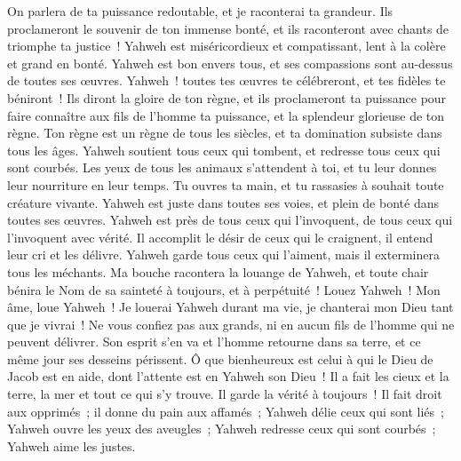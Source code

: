 \begin{multicols}{2}
 On parlera de ta puissance redoutable, et je raconterai ta grandeur.
 Ils proclameront le souvenir de ton immense bonté, et ils raconteront avec chants de triomphe ta justice~!
 Yahweh est miséricordieux et compatissant, lent à la colère et grand en bonté.
 Yahweh est bon envers tous, et ses compassions sont au-dessus de toutes ses œuvres.
 Yahweh~! toutes tes œuvres te célébreront, et tes fidèles te béniront~!
 Ils diront la gloire de ton règne, et ils proclameront ta puissance
 pour faire connaître aux fils de l'homme ta puissance, et la splendeur glorieuse de ton règne.
 Ton règne est un règne de tous les siècles, et ta domination subsiste dans tous les âges.
 Yahweh soutient tous ceux qui tombent, et redresse tous ceux qui sont courbés.
 Les yeux de tous les animaux s'attendent à toi, et tu leur donnes leur nourriture en leur temps.
 Tu ouvres ta main, et tu rassasies à souhait toute créature vivante.
 Yahweh est juste dans toutes ses voies, et plein de bonté dans toutes ses œuvres.
 Yahweh est près de tous ceux qui l'invoquent, de tous ceux qui l'invoquent avec vérité.
 Il accomplit le désir de ceux qui le craignent, il entend leur cri et les délivre.
 Yahweh garde tous ceux qui l'aiment, mais il exterminera tous les méchants.
 Ma bouche racontera la louange de Yahweh, et toute chair bénira le Nom de sa sainteté à toujours, et à perpétuité~!
\VerseOne{}Louez Yahweh~! Mon âme, loue Yahweh~!
Je louerai Yahweh durant ma vie, je chanterai mon Dieu tant que je vivrai~!
Ne vous confiez pas aux grands, ni en aucun fils de l'homme qui ne peuvent délivrer.
Son esprit s'en va et l'homme retourne dans sa terre, et ce même jour ses desseins périssent.
Ô que bienheureux est celui à qui le Dieu de Jacob est en aide, dont l'attente est en Yahweh son Dieu~!
Il a fait les cieux et la terre, la mer et tout ce qui s'y trouve. Il garde la vérité à toujours~!
Il fait droit aux opprimés~; il donne du pain aux affamés~; Yahweh délie ceux qui sont liés~;
Yahweh ouvre les yeux des aveugles~; Yahweh redresse ceux qui sont courbés~; Yahweh aime les justes.

\end{multicols}
